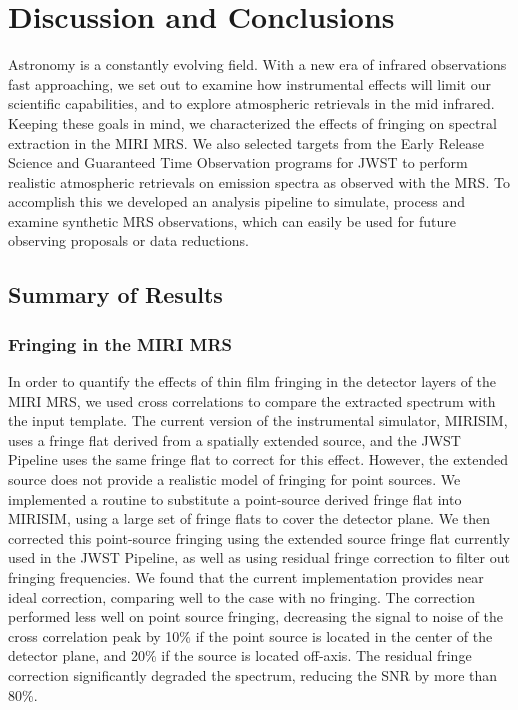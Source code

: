 \chapter{Discussion and Conclusions}
Astronomy is a constantly evolving field. 
With a new era of  infrared observations fast approaching, we set out to examine how instrumental effects will limit our scientific capabilities, and to explore atmospheric retrievals in the mid infrared.
Keeping these goals in mind, we characterized the effects of fringing on spectral extraction in the MIRI MRS.
We also selected targets from the Early Release Science and Guaranteed Time Observation programs for JWST to perform realistic atmospheric retrievals on emission spectra as observed with the MRS.
To accomplish this we developed an analysis pipeline to simulate, process and examine synthetic MRS observations, which can easily be used for future observing proposals or data reductions.

\section{Summary of Results}
\subsection{Fringing in the MIRI MRS}
In order to quantify the effects of thin film fringing in the detector layers of the MIRI MRS, we used cross correlations to compare the extracted spectrum with the input template.
The current version of the instrumental simulator, MIRISIM, uses a fringe flat derived from a spatially extended source, and the JWST Pipeline uses the same fringe flat to correct for this effect.
However, the extended source does not provide a realistic model of fringing for point sources. 
We implemented a routine to substitute a point-source derived fringe flat into MIRISIM, using a large set of fringe flats to cover the detector plane.
We then corrected this point-source fringing using the extended source fringe flat currently used in the JWST Pipeline, as well as using residual fringe correction to filter out fringing frequencies.
We found that the current implementation provides near ideal correction, comparing well to the case with no fringing.
The correction performed less well on point source fringing, decreasing the signal to noise of the cross correlation peak by 10\% if the point source is located in the center of the detector plane, and 20\% if the source is located off-axis.
The residual fringe correction significantly degraded the spectrum, reducing the SNR by more than 80\%.

